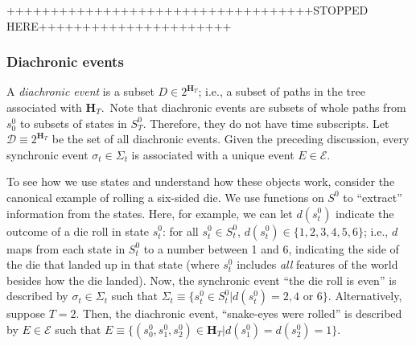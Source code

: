 \documentclass[
11pt,
titlepage,
reqno,
]{article}%
\theoremstyle{definition}
\begin{document}



	 +++++++++++++++++++++++++++++++++++STOPPED HERE++++++++++++++++++++++
	

\subsubsection{Diachronic events}
	
	A \textit{diachronic event} is a subset $D\in 2^{\mathbf{H}_T}$; i.e., a subset of paths in the tree associated with $\mathbf{H}_T$.\
	Note that diachronic events are subsets of whole paths from $s^0_0$ to subsets of states in $S^0_T$. 
	Therefore, they do not have time subscripts.
	Let $\mathcal{D}\equiv 2^{\mathbf{H}_T}$ be the set of all diachronic events.
	Given the preceding discussion, every synchronic event $\sigma_t\in\Sigma_t$ is associated with a unique event $E\in \mathcal{E}$. 

	
	To see how we use states and understand how these objects work, consider the canonical example of rolling a six-sided die. 
	We use functions on $S^0$ to ``extract'' information from the states. 
	Here, for example, we can let $d(s^0_t)$ indicate the outcome of a die roll in state $s^0_t$: for all $s^0_t\in S^0_t$, $d(s^0_t)\in\{1,2,3,4,5,6\}$; i.e., $d$ maps from each state in $S^0_t$ to a number between 1 and 6, indicating the side of the die that landed up in that state (where $s^0_t$ includes \textit{all} features of the world besides how the die landed).
	Now, the synchronic event ``the die roll is even'' is described by $\sigma_t\in\Sigma_t$ such that $\Sigma_t\equiv\{s^0_t\in S^0_t|d(s^0_t)=2,4\text{ or }6\}$. 
	Alternatively, suppose $T=2$.
	Then, the diachronic event, ``snake-eyes were rolled'' is described by $E\in\mathcal{E}$ such that $E\equiv\{(s^0_0,s^0_1,s^0_2)\in \mathbf{H}_T|d(s^0_1)=d(s^0_2)=1\}$.
	
\end{document}
